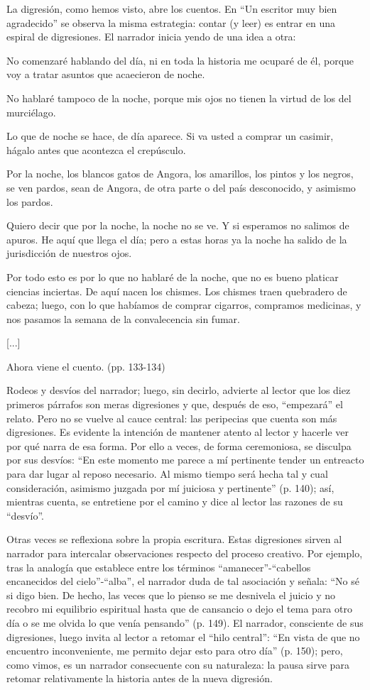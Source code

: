 \documentclass[14pt,twoside,final]{extbook} %
\begin{document}
La digresión, como hemos visto, abre los cuentos. En ``Un escritor muy bien agradecido'' se observa la misma estrategia: contar (y leer) es entrar en una espiral de digresiones. El narrador inicia yendo de una idea a otra:
\begin{quoting}
No comenzaré hablando del día, ni en toda la historia me ocuparé de él, porque voy a tratar asuntos que acaecieron de noche.

No hablaré tampoco de la noche, porque mis ojos no tienen la virtud de los del murciélago.

Lo que de noche se hace, de día aparece. Si va usted a comprar un casimir, hágalo antes que acontezca el crepúsculo.

Por la noche, los blancos gatos de Angora, los amarillos, los pintos y los negros, se ven pardos, sean de Angora, de otra parte o del país desconocido, y asimismo los pardos.

Quiero decir que por la noche, la noche no se ve. Y si esperamos no salimos de apuros. He aquí que llega el día; pero a estas horas ya la noche ha salido de la jurisdicción de nuestros ojos.

Por todo esto es por lo que no hablaré de la noche, que no es bueno platicar ciencias inciertas. De aquí nacen los chismes. Los chismes traen quebradero de cabeza; luego, con lo que habíamos de comprar cigarros, compramos medicinas, y nos pasamos la semana de la convalecencia sin fumar. 

\centerline{[...]}

Ahora viene el cuento. (pp. 133-134)
\end{quoting}
Rodeos y desvíos del narrador; luego, sin decirlo, advierte al lector que los diez primeros párrafos son meras digresiones y que, después de eso, ``empezará'' el relato. Pero no se vuelve al cauce central: las peripecias que cuenta son más digresiones. Es evidente la intención de mantener
atento al lector y hacerle ver por qué narra de esa forma. Por ello a veces, de forma ceremoniosa, se
disculpa por sus desvíos: ``En este momento me parece a mí pertinente tender un entreacto para dar lugar al reposo necesario. Al mismo tiempo será hecha tal y cual consideración, asimismo juzgada por mí juiciosa y pertinente'' (p. 140); así, mientras cuenta, se entretiene por el camino y dice al lector las razones de su ``desvío''.

Otras veces se reflexiona sobre la propia escritura. Estas digresiones sirven al narrador para intercalar observaciones respecto del proceso creativo. Por ejemplo, tras la analogía que establece entre los términos ``amanecer''-``cabellos encanecidos del cielo''-``alba'', el narrador duda de tal asociación y señala: ``No sé si digo bien. De hecho, las veces que lo pienso se me desnivela el juicio y no recobro mi equilibrio espiritual hasta que de cansancio o dejo el tema para otro día o se me olvida lo que venía pensando'' (p. 149). El narrador, consciente de sus digresiones, luego invita al lector a retomar el ``hilo central'': ``En vista de que no encuentro inconveniente, me permito dejar esto para otro día'' (p. 150); pero, como vimos, es un narrador consecuente con su naturaleza: la pausa sirve para retomar relativamente la historia antes de la nueva digresión.
\end{document}
